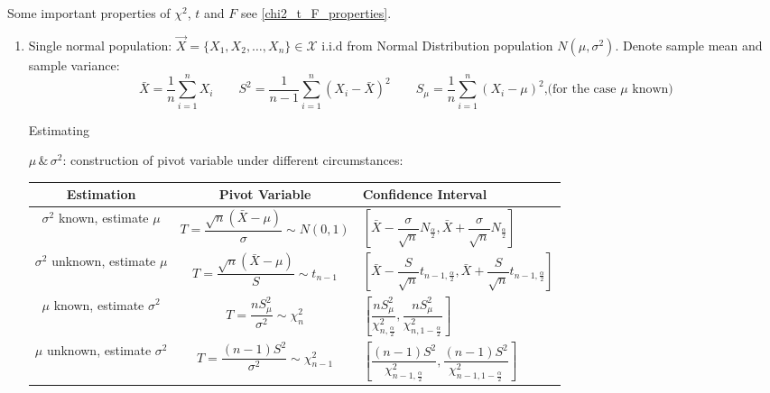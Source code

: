     Some important properties of $\chi^2$, $t$ and $F$ see \autoref{chi2_t_F_properties}.
    \begin{enumerate}
        \item Single normal population: $\vec{X}=\{X_1,X_2,\ldots,X_n\}\in\mathscr{X}$ i.i.d from Normal Distribution population $N(\mu,\sigma^2)$. Denote sample mean and sample variance: 
        \begin{equation}\bar{X}=\frac{1}{n}\sum_{i=1}^nX_i\qquad S^2=\frac{1}{n-1}\sum_{i=1}^n(X_i-\bar{X})^2\qquad S_\mu=\dfrac{1}{n}\sum_{i=1}^n(X_i-\mu)^2\text{,(for the case }\mu\text{ known)}\end{equation}

        \hypertarget{OneSampletTest}{Estimating} $\mu\,\&\,\sigma^2$: construction of pivot variable under different circumstances:


        \begin{table}[htbp]
            \centering
            \renewcommand\arraystretch{1.9}
            \begin{tabularx}{\linewidth}{|c|c|Y|}
                \hline 
                Estimation& Pivot Variable & Confidence Interval\\
                \hline
                $\sigma^2$ known, estimate $\mu$    &   $T=\dfrac{\sqrt{n}(\bar{X}-\mu)}{\sigma}\sim N(0,1)$ & $\left[ \bar{X}-\dfrac{\sigma}{\sqrt{n}}N_\frac{\alpha}{2},\bar{X}+\dfrac{\sigma}{\sqrt{n}}N_\frac{\alpha}{2} \right]$\\
                \hline
                $\sigma^2$ unknown, estimate $\mu$&$T=\dfrac{\sqrt{n}(\bar{X}-\mu)}{S}\sim t_{n-1}$&$\left[\bar{X}-\dfrac{S}{\sqrt{n}}t_{n-1,\frac{\alpha}{2}},\bar{X}+\dfrac{S}{\sqrt{n}}t_{n-1,\frac{\alpha}{2}}\right]$\\
                \hline
                $\mu$ known, estimate $\sigma^2$&$T=\dfrac{nS_\mu^2}{\sigma^2}\sim\chi_n^2$&$\left[\dfrac{nS^2_\mu}{\chi^2_{n,\frac{\alpha}{2}}},\dfrac{nS^2_\mu}{\chi^2_{n,1-\frac{\alpha}{2}}}\right]$\\
                \hline
                $\mu$ unknown, estimate $\sigma^2$&$T=\dfrac{(n-1)S^2}{\sigma^2}\sim\chi^2_{n-1} $&$\left[\dfrac{(n-1)S^2}{\chi^2_{n-1,\frac{\alpha}{2}}},\dfrac{(n-1)S^2}{\chi^2_{n-1,1-\frac{\alpha}{2}}}\right]$\\
                \hline
            \end{tabularx}
        \end{table}


\end{enumerate}
